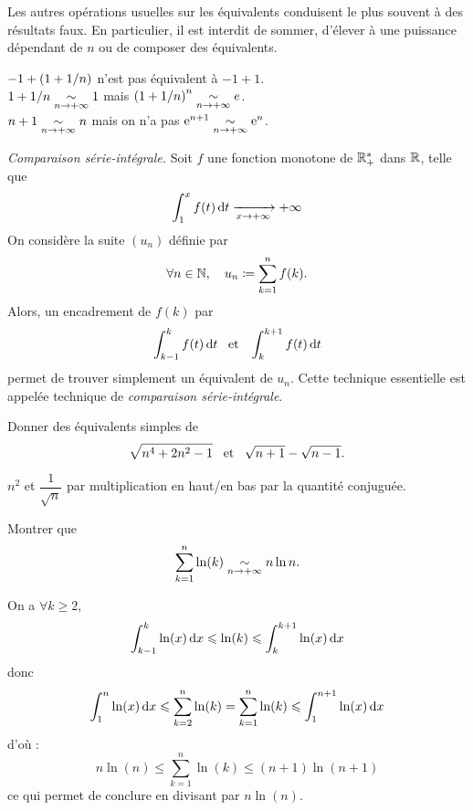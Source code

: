 \documentclass{magnoliaold}
\begin{document}
\begin{remarques}
\remarque Les autres opérations usuelles sur les équivalents conduisent le plus
  souvent à des résultats faux. En particulier, il est interdit de sommer, d'élever à une
  puissance dépendant de $n$ ou de composer des équivalents.
  
  \begin{sol}
  $-1+\left(1+1/n\right)$ n'est pas équivalent à $-1+1$.\\
  $1+1/n \underset{n\rightarrow +\infty}{\sim}{1}$ mais $\left(1+1/n\right)^n\underset{n\rightarrow +\infty}{\sim}{e}$.\\
  $n+1\underset{n\rightarrow +\infty}{\sim}{n}$ mais on n'a pas ${\rm e}^{n+1}\underset{n\rightarrow +\infty}{\sim}{{\rm e}^n}$.
  \end{sol}
\remarque \emph{Comparaison série-intégrale.}
  Soit $f$ une fonction monotone de $\mathbb{R}_+^*$ dans $\mathbb{R}$, telle que
  \[\int_{1}^{x} f(t)\,\text{d}t\xrightarrow[x\rightarrow +\infty]{} +\infty\]
  On considère la suite $(u_n)$ définie par
  \[\forall n\in\mathbb{N} ,\quad u_n\coloneqq\sum_{k=1}^n f(k).\]
  Alors, un encadrement de $f(k)$ par 
  \[\int_{k-1}^{k} f(t)\,\text{d}t \quad\!\text{et}\quad\! \int_{k}^{k+1} f(t)\,\text{d}t\]
  permet de trouver simplement un équivalent de $u_n$. Cette technique
  essentielle est appelée technique de \emph{comparaison série-intégrale}.
\end{remarques}

\begin{exos}
\exo Donner des équivalents simples de
  \[\sqrt{n^4+2n^2-1} \quad\!\text{et}\quad\! \sqrt{n+1}-\sqrt{n-1}.\]
  
  \begin{sol}
  $n^2$ et $\dfrac{1}{\sqrt{n}}$ par multiplication en haut/en bas par la quantité conjuguée.
  \end{sol}
\exo Montrer que
  \[\sum_{k=1}^n \ln(k)\underset{n\rightarrow +\infty}{\sim} n\ln n.\]

\begin{sol}
On a $\forall k\geq 2$, $$\int_{k-1}^{k} \ln(x)\,\text{d}x\leqslant \ln(k) \leqslant \int_{k}^{k+1} \ln(x)\,\text{d}x$$ donc $$\int_{1}^{n} \ln(x)\,\text{d}x\leqslant \sum_{k=2}^n\ln(k)=\sum_{k=1}^n\ln(k)\leqslant \int_{1}^{n+1} \ln(x)\,\text{d}x$$
d'où :
$$n\ln(n)\leq \sum_{k=1}^n\ln(k)\leq (n+1)\ln(n+1)$$
ce qui permet de conclure en divisant par $n\ln(n)$.

\end{sol}
\end{exos}

\end{document}
